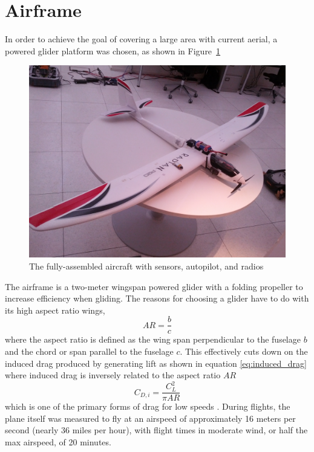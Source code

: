\documentclass[12pt]{report}
\begin{document}
\section{Airframe}
In order to achieve the goal of covering a large area with current aerial, a powered glider platform was chosen, as shown in Figure~\ref{fig:Assembled plane on table}
\begin{figure}[!ht]
	\centering
	\includegraphics[scale=0.1]{planeOnTable.jpg}
	\caption{The fully-assembled aircraft with sensors, autopilot, and radios \cite{Vogt}}
	\label{fig:Assembled plane on table}
\end{figure}
The airframe is a two-meter wingspan powered glider with a folding propeller 
to increase efficiency when gliding. The reasons for choosing a glider have to do with its high aspect ratio wings,
\begin{equation}
	AR = \frac{b}{c}
	\label{eq:aspect ratio}
\end{equation}
where the aspect ratio is defined as the wing span perpendicular to the fuselage $b$ and the chord or span parallel to the fuselage $c$. This effectively cuts down on the induced drag produced by generating lift as shown in equation \ref{eq:induced_drag} where induced drag is inversely related to the aspect ratio $AR$
\begin{equation}
	C_{D,i}=\frac{C_L^2}{\pi AR}
	\label{eq:induced_drag}
\end{equation}
which is one of the primary forms of drag for low speeds \cite{Anderson01}. During flights, the plane itself was measured to fly at an airspeed of approximately 16 meters per second (nearly 36 miles per hour), with flight times in moderate wind, or half the max airspeed, of 20 minutes.
\end{document}
